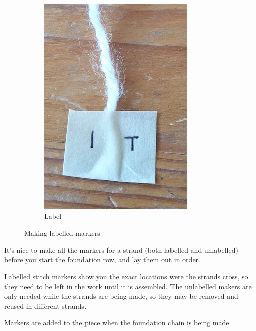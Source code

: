 \documentclass[openany]{book}
\begin{document}
\begin{figure}[H]
\begin{subfigure}[t]{.3\textwidth}
\includegraphics[width=.9\textwidth]{pic/M3}
\caption{Label}
\end{subfigure}
%
\caption{Making labelled markers}
\end{figure}

It's nice to make all the markers for a strand (both labelled and unlabelled) before you start the foundation row, and lay them out in order. 

Labelled stitch markers show you the exact locations were the strands cross, so they need to be left in the work until it is assembled. The unlabelled makers are only needed while the strands are being made, so they may be removed and reused in different strands.

Markers are added to the piece when the foundation chain is being made.
\end{document}

